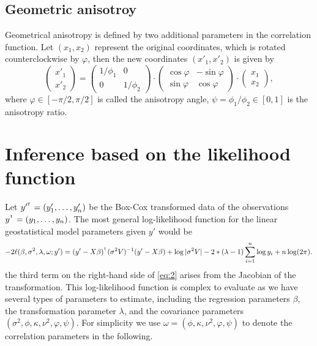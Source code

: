 \documentclass{article}\usepackage[]{graphicx}\usepackage[]{color}
\def\T{{\footnotesize {^{_{\sf T}}}}}
\begin{document}
\subsection{Geometric anisotroy}
Geometrical anisotropy is defined by two additional parameters in the correlation function. Let $(x_1, x_2)$ represent the original coordinates, which is rotated counterclockwise by $\varphi$, then the new coordinates $(x'_1, x'_2)$ is given by
%
  \begin{equation*}\label{eq:matrixeqn}
    \begin{pmatrix}
      x'_{1} \\
      x'_{2}  
    \end{pmatrix}
    =
    \begin{pmatrix}
      1/\phi_{1} & 0 \\
      0 & 1/ \phi_{2} 
    \end{pmatrix}
    \cdot
    \begin{pmatrix}
      \cos \varphi & -\sin \varphi \\
      \sin \varphi & \cos \varphi 
    \end{pmatrix}
    \cdot
      \begin{pmatrix}
      x_1 \\
      x_2 
    \end{pmatrix},
  \end{equation*}
%
where $\varphi \in [-\pi/2, \pi/2]$ is called the anisotropy angle, $\psi = \phi_1 / \phi_2 \in [0,1]$ is the anisotropy ratio. %

\section{Inference based on the likelihood function}
Let $y'^\T=(y'_1,\dots,y'_n)$ be the Box-Cox transformed data of the observations $y^\T=(y_1,\dots,y_n)$. The most general log-likelihood function for the linear geostatistical model parameters given $y'$ would be
%
\begin{equation}
-2\ell(\beta,\sigma^2, \lambda, \omega; y')=(y'-X\beta)^\T(\sigma^2 V)^{-1}(y'-X\beta)+\log |\sigma^2 V|-2*(\lambda-1)\sum_{i=1}^{n}\log y_i+n\log(2\pi).\label{eq:2}
\end{equation}
%
the third term on the right-hand side of \eqref{eq:2} arises from the Jacobian of the transformation. This log-likelihood function is complex to evaluate as we have several types of parameters to estimate, including the regression parameters $\beta$, the transformation parameter $\lambda$, and the covariance parameters $(\sigma^2, \phi,\kappa,\nu^2, \varphi, \psi)$. For simplicity we use $\omega=(\phi,\kappa,\nu^2, \varphi, \psi)$ to denote the correlation parameters in the following. 
\end{document}

